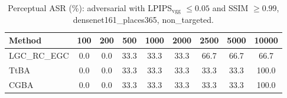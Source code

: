 \begin{table}[t]
\centering\footnotesize
\caption{Perceptual ASR (\%): adversarial with LPIPS$_{\mathrm{vgg}}$ $\le 0.05$ and SSIM $\ge 0.99$, densenet161\_places365, non\_targeted.}
\begin{tabular}{lcccccccc}
\toprule
Method & 100 & 200 & 500 & 1000 & 2000 & 2500 & 5000 & 10000 \\
\midrule
LGC\_RC\_EGC & 0.0 & 0.0 & 33.3 & 33.3 & 33.3 & 66.7 & 66.7 & 66.7 \\
TtBA & 0.0 & 0.0 & 33.3 & 33.3 & 33.3 & 33.3 & 33.3 & 100.0 \\
CGBA & 0.0 & 0.0 & 33.3 & 33.3 & 33.3 & 33.3 & 33.3 & 100.0 \\
\bottomrule
\end{tabular}
\end{table}
